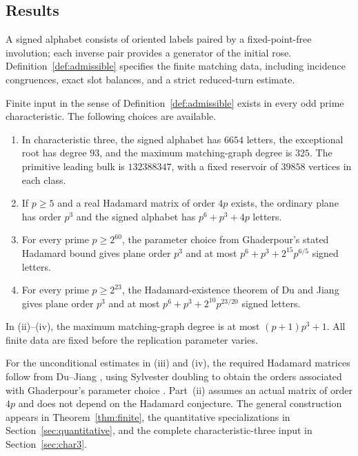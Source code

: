 \subsection{Results}
A signed alphabet consists of oriented labels paired by a fixed-point-free involution; each inverse pair provides a generator of the initial rose. Definition~\ref{def:admissible} specifies the finite matching data, including incidence congruences, exact slot balances, and a strict reduced-turn estimate.

\begin{theorem}\label{thm:headline}
Finite input in the sense of Definition~\ref{def:admissible} exists in every odd prime characteristic. The following choices are available.
\begin{enumerate}[label=\textup{(\roman*)},leftmargin=2em]
\item In characteristic three, the signed alphabet has $6654$ letters, the exceptional root has degree $93$, and the maximum matching-graph degree is $325$. The primitive leading bulk is $132388347$, with a fixed reservoir of $39858$ vertices in each class.
\item If $p\ge5$ and a real Hadamard matrix of order $4p$ exists, the ordinary plane has order $p^3$ and the signed alphabet has $p^6+p^3+4p$ letters.
\item For every prime $p\ge2^{60}$, the parameter choice from Ghaderpour's stated Hadamard bound gives plane order $p^3$ and at most $p^6+p^3+2^{15}p^{6/5}$ signed letters.
\item For every prime $p\ge2^{23}$, the Hadamard-existence theorem of Du and Jiang gives plane order $p^3$ and at most $p^6+p^3+2^{10}p^{23/20}$ signed letters.
\end{enumerate}
In \textup{(ii)--(iv)}, the maximum matching-graph degree is at most $(p+1)p^3+1$. All finite data are fixed before the replication parameter varies.
\end{theorem}

For the unconditional estimates in \textup{(iii)} and \textup{(iv)}, the required Hadamard matrices follow from Du--Jiang \cite[Theorem~3]{DJ24}, using Sylvester doubling to obtain the orders associated with Ghaderpour's parameter choice \cite[Theorem~10]{Gh15}. Part~\textup{(ii)} assumes an actual matrix of order $4p$ and does not depend on the Hadamard conjecture. The general construction appears in Theorem~\ref{thm:finite}, the quantitative specializations in Section~\ref{sec:quantitative}, and the complete characteristic-three input in Section~\ref{sec:char3}.

